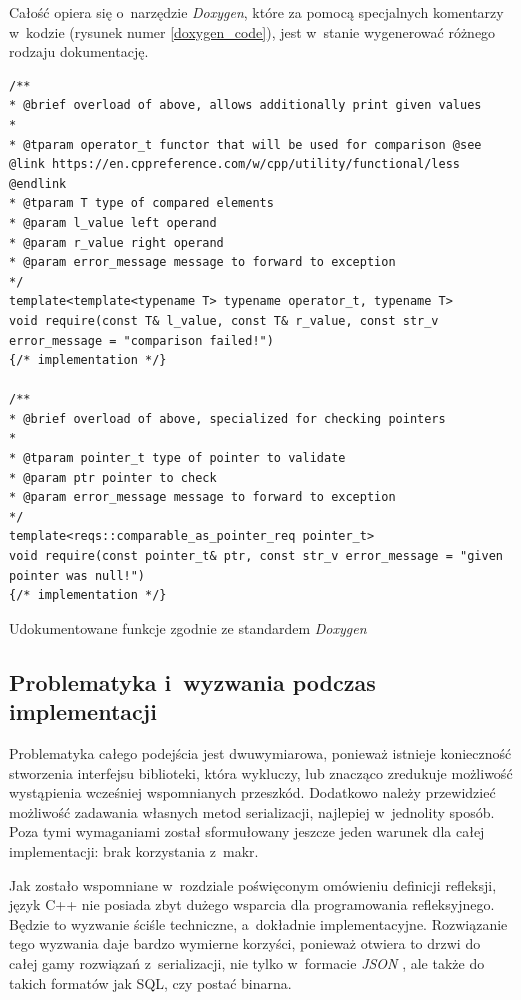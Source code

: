 \documentclass[12pt]{article}
\newcommand{\n}{\newline}
\newcommand{\nonpl}[1]{{\it #1}}
\newcommand{\JSON}{\nonpl{JSON} }
\begin{document}
{{{				\newpage

				Całość opiera się o~narzędzie \nonpl{Doxygen}\cite{doxygen_docs}, które za pomocą specjalnych komentarzy w~kodzie (rysunek numer \ref{doxygen_code}),
				jest w~stanie wygenerować różnego rodzaju dokumentację.\n

				\begin{captioned}[H]
					\begin{lstlisting}[frame=single]
/**
* @brief overload of above, allows additionally print given values
*
* @tparam operator_t functor that will be used for comparison @see @link https://en.cppreference.com/w/cpp/utility/functional/less @endlink
* @tparam T type of compared elements
* @param l_value left operand
* @param r_value right operand
* @param error_message message to forward to exception
*/
template<template<typename T> typename operator_t, typename T>
void require(const T& l_value, const T& r_value, const str_v error_message = "comparison failed!")
{/* implementation */}

/**
* @brief overload of above, specialized for checking pointers
*
* @tparam pointer_t type of pointer to validate
* @param ptr pointer to check
* @param error_message message to forward to exception
*/
template<reqs::comparable_as_pointer_req pointer_t>
void require(const pointer_t& ptr, const str_v error_message = "given pointer was null!")
{/* implementation */}
					\end{lstlisting}
					\caption{ Udokumentowane funkcje zgodnie ze standardem \nonpl{Doxygen}}
					\label{doxygen_code}
				\end{captioned}
			}
		}

		{
			\subsection{Problematyka i~wyzwania podczas implementacji}

			Problematyka całego podejścia jest dwuwymiarowa, ponieważ istnieje konieczność stworzenia interfejsu biblioteki, która wykluczy, lub znacząco
			zredukuje możliwość wystąpienia wcześniej wspomnianych przeszkód. Dodatkowo należy przewidzieć możliwość zadawania własnych metod serializacji,
			najlepiej w~jednolity sposób. Poza tymi wymaganiami został sformułowany jeszcze jeden warunek dla całej implementacji: brak korzystania z~makr.\n

			Jak zostało wspomniane w~rozdziale poświęconym omówieniu definicji refleksji, język C++ nie posiada zbyt dużego wsparcia dla programowania
			refleksyjnego. Będzie to wyzwanie ściśle techniczne, a~dokładnie implementacyjne. Rozwiązanie tego wyzwania daje bardzo wymierne korzyści,
			ponieważ otwiera to drzwi do całej gamy rozwiązań z~serializacji, nie tylko w~formacie \JSON, ale także do takich formatów jak SQL, czy
			postać binarna.\n

}}
\end{document}
